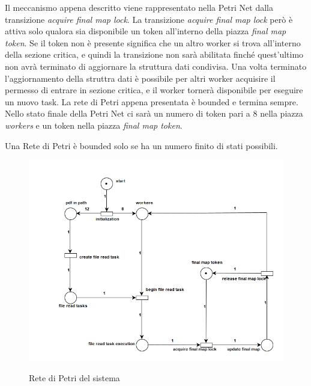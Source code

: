 Il meccanismo appena descritto viene rappresentato nella Petri Net dalla transizione \textit{acquire final map lock}.\newline
La transizione \textit{acquire final map lock} però è attiva solo qualora sia disponibile un token all'interno della piazza \textit{final map token}. Se il token non è presente significa che un altro worker si trova all'interno della sezione critica, e quindi la transizione non sarà abilitata finché quest'ultimo non avrà terminato di aggiornare la struttura dati condivisa.\newline
Una volta terminato l'aggiornamento della struttra dati è possibile per altri worker acquisire il permesso di entrare in sezione critica, e il worker tornerà disponibile per eseguire un nuovo task.\newline
La rete di Petri appena presentata è bounded e termina sempre.\newline
Nello stato finale della Petri Net ci sarà un numero di token pari a 8 nella piazza \textit{workers} e un token nella piazza \textit{final map token}.
\begin{info}
Una Rete di Petri è bounded solo se ha un numero finito di stati possibili.
\end{info}
\begin{figure}[H]
	\begin{center}
		\includegraphics[width=\linewidth]{img/petrinet.png}
		\label{fig:petrinet}
		\caption{Rete di Petri del sistema}
	\end{center}
\end{figure}

